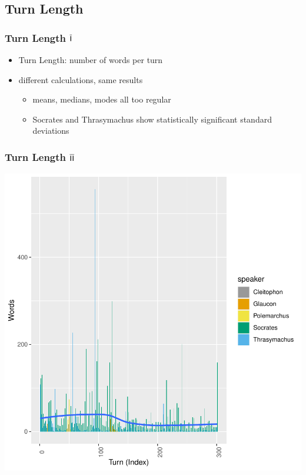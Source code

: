 \documentclass{beamer}
\renewcommand{\Roman}[1]{$\overline{\textsf{\small{\MakeUppercase{\romannumeral #1}}}}$}
\begin{document}
\subsection{Turn Length} %


\begin{frame}
\frametitle{Turn Length \Roman{1}}
\begin{itemize}
\item Turn Length: number of words per turn
\item different calculations, same results
  \begin{itemize}
  \item means, medians, modes all too regular
  \item Socrates and Thrasymachus show statistically significant standard deviations
  \end{itemize}
\end{itemize}
\end{frame}



\begin{frame}
\frametitle{Turn Length \Roman{2}}
\includegraphics{GreatSlideshow-008}
\end{frame}
\end{document}
